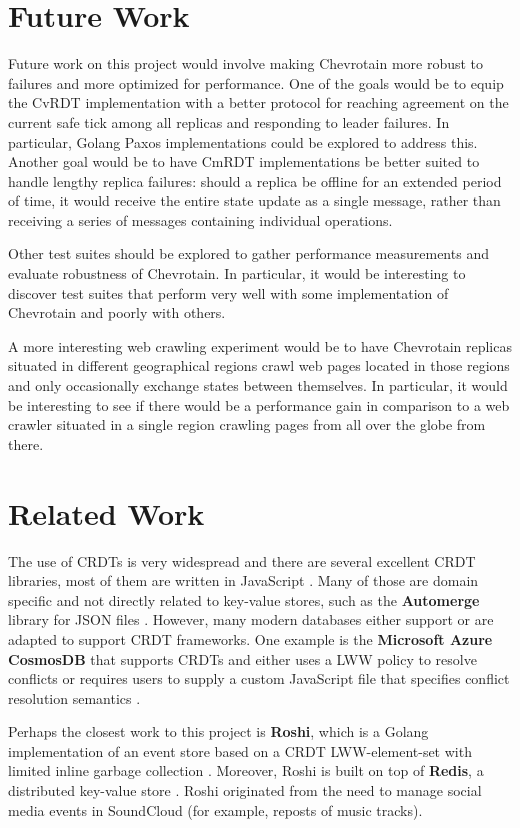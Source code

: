 \documentclass[sigconf,nonacm,10pt]{acmart}
\begin{document}
\section{Future Work}
Future work on this project would involve making Chevrotain more robust to failures and more optimized for performance. One of the goals would be to equip the CvRDT implementation with a better protocol for reaching agreement on the current safe tick among all replicas and responding to leader failures. In particular, Golang Paxos implementations \cite{paxos} could be explored to address this. Another goal would be to have CmRDT implementations be better suited to handle lengthy replica failures: should a replica be offline for an extended period of time, it would receive the entire state update as a single message, rather than receiving a series of messages containing individual operations.

Other test suites should be explored to gather performance measurements and evaluate robustness of Chevrotain. In particular, it would be interesting to discover test suites that perform very well with some implementation of Chevrotain and poorly with others.

A more interesting web crawling experiment would be to have Chevrotain replicas situated in different geographical regions crawl web pages located in those regions and only occasionally exchange states between themselves. In particular, it would be interesting to see if there would be a performance gain in comparison to a web crawler situated in a single region crawling pages from all over the globe from there.

\section{Related Work} %
The use of CRDTs is very widespread and there are several excellent CRDT libraries, most of them are written in JavaScript \cite{crdt}. Many of those are domain specific and not directly related to key-value stores, such as the \textbf{Automerge} library for JSON files \cite{automerge}. However, many modern databases either support or are adapted to support CRDT frameworks. One example is the \textbf{Microsoft Azure CosmosDB} that supports CRDTs and either uses a LWW policy to resolve conflicts or requires users to supply a custom JavaScript file that specifies conflict resolution semantics \cite{cosmosdb}. 

Perhaps the closest work to this project is \textbf{Roshi}, which is a Golang implementation of an event store based on a CRDT LWW-element-set with limited inline garbage collection \cite{roshi}. Moreover, Roshi is built on top of \textbf{Redis}, a distributed key-value store \cite{redis}. Roshi originated from the need to manage social media events in SoundCloud (for example, reposts of music tracks).
\end{document}
